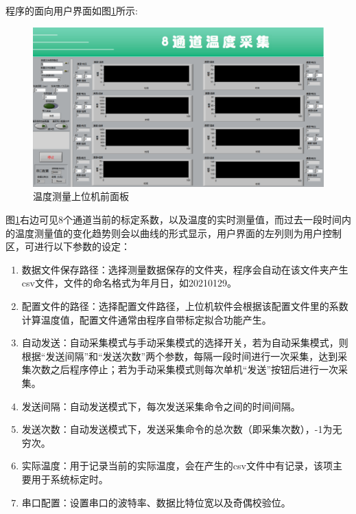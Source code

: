程序的面向用户界面如图\ref{fig:温度测量上位机前面板}所示:
\begin{figure}[htb]
    \centering
    \includegraphics[width=14cm]{fig/3-fig/温度采集上位机前面板.jpg}
    \caption{温度测量上位机前面板}
    \label{fig:温度测量上位机前面板}
\end{figure}

图\ref{fig:温度测量上位机前面板}右边可见8个通道当前的标定系数，以及温度的实时测量值，而过去一段时间内的温度测量值的变化趋势则会以曲线的形式显示，用户界面的左列则为用户控制区，可进行以下参数的设定：
\begin{enumerate}
    \item 数据文件保存路径：选择测量数据保存的文件夹，程序会自动在该文件夹产生csv文件，文件的命名格式为年月日，如20210129。
    \item 配置文件的路径：选择配置文件路径，上位机软件会根据该配置文件里的系数计算温度值，配置文件通常由程序自带标定拟合功能产生。
    \item 自动发送：自动采集模式与手动采集模式的选择开关，若为自动采集模式，则根据“发送间隔”和“发送次数”两个参数，每隔一段时间进行一次采集，达到采集次数之后程序停止；若为手动采集模式则每次单机“发送”按钮后进行一次采集。
    \item 发送间隔：自动发送模式下，每次发送采集命令之间的时间间隔。
    \item 发送次数：自动发送模式下，发送采集命令的总次数（即采集次数），-1为无穷次。
    \item 实际温度：用于记录当前的实际温度，会在产生的csv文件中有记录，该项主要用于系统标定时。
    \item 串口配置：设置串口的波特率、数据比特位宽以及奇偶校验位。
  \end{enumerate}

